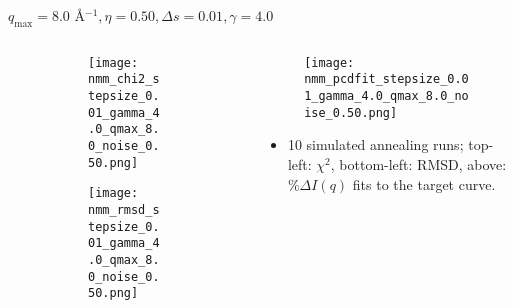 \documentclass{beamer}
\begin{document}
\begin{frame}{$ q_{\textrm{max}}=8.0 $ \AA $^{-1}, \eta=0.50, \Delta s=0.01, \gamma=4.0$}
	\begin{columns}
		\begin{column}{.5\textwidth}
			\begin{figure}[H]
			\centering
			\begin{subfigure}[b]{\textwidth}
				\centering
				\texttt{[image: nmm\_chi2\_stepsize\_0.01\_gamma\_4.0\_qmax\_8.0\_noise\_0.50.png]}
				\label{fig:}
			\end{subfigure}
			\begin{subfigure}[b]{\textwidth}
				\centering
				\texttt{[image: nmm\_rmsd\_stepsize\_0.01\_gamma\_4.0\_qmax\_8.0\_noise\_0.50.png]}
				\label{fig:}
			\end{subfigure}
			\end{figure}
		\end{column}
		\begin{column}{.5\textwidth}
			\begin{figure}[H]
				\centering
				\texttt{[image: nmm\_pcdfit\_stepsize\_0.01\_gamma\_4.0\_qmax\_8.0\_noise\_0.50.png]}
				\label{fig:}
			\end{figure}
			\begin{itemize}
				\item 10 simulated annealing runs; top-left: $\chi^2$, bottom-left: RMSD, above: $\%\Delta I(q)$ fits to the target curve.
			\end{itemize}
		\end{column}
	\end{columns}
\end{frame}
 
\end{document}
